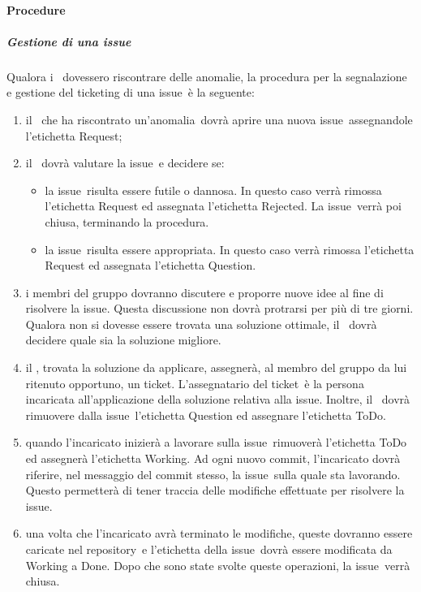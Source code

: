 \documentclass[../NormeProgetto.tex]{subfiles}
\begin{document}
	\paragraph{Procedure}
	\subparagraph{Gestione di una issue}
				Qualora i \verificatori\ dovessero riscontrare delle anomalie, la procedura per la segnalazione e gestione del ticketing di una issue\g\ è la seguente:
					\begin{enumerate}
						\item il \verificatore\ che ha riscontrato un'anomalia\g\ dovrà aprire una nuova issue\g\ assegnandole l'etichetta Request;
						\item il \responsabilediprogetto\ dovrà valutare la issue\g\ e decidere se:			\begin{itemize}
							\item la issue\g\ risulta essere futile o dannosa. In questo caso verrà rimossa l'etichetta Request ed assegnata l'etichetta Rejected. La issue\g\ verrà poi chiusa, terminando la procedura.
							\item la issue\g\ risulta essere appropriata. In questo caso verrà rimossa l'etichetta Request ed assegnata l'etichetta Question. 
						\end{itemize}
						\item i membri del gruppo dovranno discutere e proporre nuove idee al fine di risolvere la issue\g. Questa discussione non dovrà protrarsi per più di tre giorni. Qualora non si dovesse essere trovata una soluzione ottimale, il \responsabilediprogetto\ dovrà decidere quale sia la soluzione migliore.
						\item il \responsabilediprogetto, trovata la soluzione da applicare,  assegnerà, al membro del gruppo da lui ritenuto opportuno, un ticket\g. L'assegnatario del ticket\g\ è la persona incaricata all'applicazione della soluzione relativa alla issue\g. Inoltre, il \responsabilediprogetto\ dovrà rimuovere dalla issue\g\ l'etichetta Question ed assegnare l'etichetta ToDo.
						\item quando l'incaricato inizierà a lavorare sulla issue\g\ rimuoverà l'etichetta ToDo ed assegnerà l'etichetta Working. Ad ogni nuovo commit, l'incaricato dovrà riferire, nel messaggio del commit stesso, la issue\g\ sulla quale sta lavorando. Questo permetterà di tener traccia delle modifiche effettuate per risolvere la issue\g.
						\item una volta che l'incaricato avrà terminato le modifiche, queste dovranno essere caricate nel repository\g\ e l'etichetta della issue\g\ dovrà essere modificata da Working a Done. Dopo che sono state svolte queste operazioni, la issue\g\ verrà chiusa.
					\end{enumerate}
\end{document}
